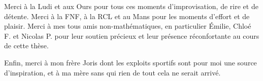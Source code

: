 \medskip

Merci à la Ludi et aux Ours pour tous ces moments d'improvisation, de rire et
de détente. Merci à la FNF, à la RCL et au Mans pour les moments d'effort et
de plaisir. Merci à mes tous amis non-mathématiques, en particulier Émilie,
Chloé F. et Nicolas P. pour leur soutien précieux et leur présence
réconfortante au cours de cette thèse.

Enfin, merci à mon frère Joris dont les exploits sportifs sont pour moi une
source d'inspiration, et à ma mère sans qui rien de tout cela ne serait
arrivé.

\cleardoublepage
\endinput

